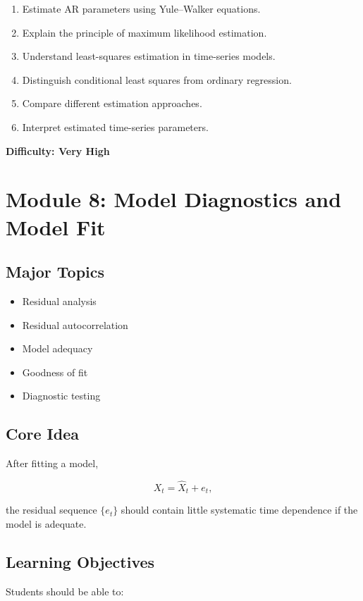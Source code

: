 \documentclass[11pt]{article}
\begin{document}
\begin{enumerate}
    \item Estimate AR parameters using Yule--Walker equations.
    \item Explain the principle of maximum likelihood estimation.
    \item Understand least-squares estimation in time-series models.
    \item Distinguish conditional least squares from ordinary regression.
    \item Compare different estimation approaches.
    \item Interpret estimated time-series parameters.
\end{enumerate}

\textbf{Difficulty: Very High}

\section{Module 8: Model Diagnostics and Model Fit}

\subsection{Major Topics}

\begin{itemize}
    \item Residual analysis
    \item Residual autocorrelation
    \item Model adequacy
    \item Goodness of fit
    \item Diagnostic testing
\end{itemize}

\subsection{Core Idea}

After fitting a model,

\[
X_t = \widehat{X}_t + e_t,
\]

the residual sequence $\{e_t\}$ should contain little systematic
time dependence if the model is adequate.

\subsection{Learning Objectives}

Students should be able to:
\end{document}
